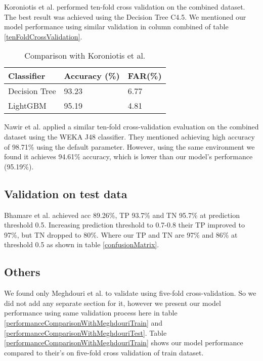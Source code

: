 \documentclass[14pt, conference]{IEEEtran}
\begin{document}
Koroniotis et al. \cite{koroniotis2017towards} performed ten-fold cross validation on the combined dataset.
The best result was achieved using the Decision Tree C4.5. We mentioned our model performance using similar
validation in column combined of table \ref{tenFoldCrossValidation}.

\begin{table}
\normalsize
\centering
\caption{Comparison with Koroniotis et al. \cite{koroniotis2017towards}}
\label{performanceComparisonWithKoroniotis}
\renewcommand{\arraystretch}{1.2}

\begin{tabular}{|C{3.3cm}|C{2.2cm}|C{1.5cm}|}
\hline
\textbf{Classifier} & \textbf{Accuracy (\%)} & \textbf{FAR(\%)} \\ \hline
Decision Tree \cite{koroniotis2017towards} & 93.23 & 6.77 \\ \hline
LightGBM & 95.19 & 4.81 \\ \hline
\end{tabular}
\end{table}

Nawir et al. \cite{nawir2019effective} applied a similar ten-fold cross-validation evaluation on the combined dataset
using the WEKA J48 classifier. They mentioned achieving high accuracy of 98.71\% using the default parameter.
However, using the same environment we found it achieves 94.61\% accuracy, which is lower than our model's
performance (95.19\%).

\subsection{Validation on test data}
Bhamare et al. \cite{bhamare2016feasibility} achieved acc 89.26\%, TP 93.7\% and TN 95.7\% at prediction threshold 0.5.
Increasing prediction threshold to 0.7-0.8 their TP improved to 97\%, but TN dropped to 80\%. Where our TP and
TN are 97\% and 86\% at threshold 0.5 as shown in table \ref{confusionMatrix}.

\subsection{Others}
We found only Meghdouri et al. \cite{meghdouri2018analysis} to validate using five-fold cross-validation.
So we did not add any separate section for it, however we present our model performance using same validation process
here in table \ref{performanceComparisonWithMeghdouriTrain} and \ref{performanceComparisonWithMeghdouriTest}.
Table \ref{performanceComparisonWithMeghdouriTrain} shows our model performance compared to their's on five-fold
cross validation of train dataset.
\end{document}
